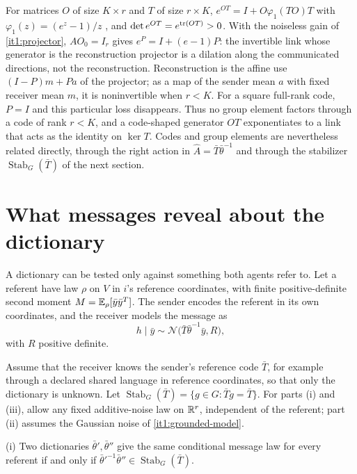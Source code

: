 For matrices $O$ of size $K\times r$ and $T$ of size $r\times K$, $e^{OT}=I+O\varphi_1(TO)T$ with $\varphi_1(z)=(e^z-1)/z$ \citep[Section~1.8]{Higham2008}, and $\det e^{OT}=e^{\operatorname{tr}(OT)}>0$. With the noiseless gain of \cref{it1:projector}, $AO_0=I_r$ gives $e^{P}=I+(e-1)P$: the invertible link whose generator is the reconstruction projector is a dilation along the communicated directions, not the reconstruction. Reconstruction is the affine use $(I-P)m+Pa$ of the projector; as a map of the sender mean $a$ with fixed receiver mean $m$, it is noninvertible when $r<K$. For a square full-rank code, $P=I$ and this particular loss disappears. Thus no group element factors through a code of rank $r<K$, and a code-shaped generator $OT$ exponentiates to a link that acts as the identity on $\ker T$. Codes and group elements are nevertheless related directly, through the right action in $\hat A=\bar T\bar\theta^{-1}$ and through the stabilizer $\operatorname{Stab}_G(\bar T)$ of the next section.

\section{What messages reveal about the dictionary}
\label{it1:ch-identifiability}

A dictionary can be tested only against something both agents refer to. Let a referent have law $\rho$ on $V$ in $i$'s reference coordinates, with finite positive-definite second moment $M=\mathbb E_\rho[\bar y\bar y^T]$. The sender encodes the referent in its own coordinates, and the receiver models the message as
\begin{equation}
h\mid\bar y\sim\mathcal N\bigl(\bar T\bar\theta^{-1}\bar y,R\bigr),
\label{it1:grounded-model}
\end{equation}
with $R$ positive definite.

Assume that the receiver knows the sender's reference code $\bar T$, for example through a declared shared language in reference coordinates, so that only the dictionary is unknown. Let $\operatorname{Stab}_G(\bar T)=\{g\in G:\bar Tg=\bar T\}$. For parts (i) and (iii), allow any fixed additive-noise law on $\mathbb R^r$, independent of the referent; part (ii) assumes the Gaussian noise of \cref{it1:grounded-model}.

\textup{(i)} Two dictionaries $\bar\theta',\bar\theta''$ give the same conditional message law for every referent if and only if $\bar\theta'^{-1}\bar\theta''\in\operatorname{Stab}_G(\bar T)$.

